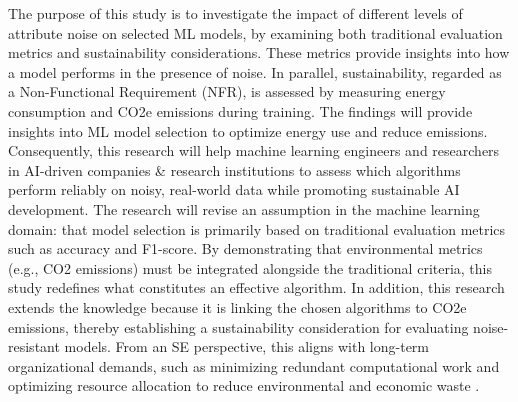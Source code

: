 \documentclass[conference]{IEEEtran}
\begin{document}
\newline
\newline
The purpose of this study is to investigate the impact of different levels of attribute noise on selected ML models, by examining both traditional evaluation metrics and sustainability considerations. These metrics provide insights into how a model performs in the presence of noise. In parallel, sustainability, regarded as a Non-Functional Requirement (NFR), is assessed by measuring energy consumption and CO2e emissions during training.
\newline
\newline
The findings will provide insights into ML model selection to optimize energy use and reduce emissions. Consequently, this research will help machine learning engineers and researchers in AI-driven companies \& research institutions to assess which algorithms perform reliably on noisy, real-world data while promoting sustainable AI development.
\newline
\newline
The research will revise an assumption in the machine learning domain: that model selection is primarily based on traditional evaluation metrics such as accuracy and F1-score.  By demonstrating that environmental metrics (e.g., CO2 emissions) must be integrated alongside the traditional criteria, this study redefines what constitutes an effective algorithm. In addition, this research extends the knowledge because it is linking the chosen algorithms to CO2e emissions, thereby establishing a sustainability consideration for evaluating noise-resistant models. From an SE perspective, this aligns with long-term organizational demands, such as minimizing redundant computational work and optimizing resource allocation to reduce environmental and economic waste \cite[pp. 290-291]{sweb}.

\end{document}
